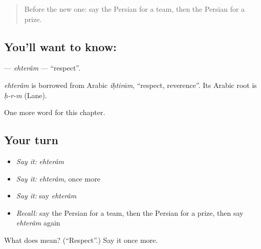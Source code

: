 \begin{quote}
Before the new one: say the Persian for a team, then the Persian for a prize.
\end{quote}

\subsection*{You'll want to know: }
\textbf{} — \emph{ehterâm} — \textquotedblleft{}respect\textquotedblright{}.

\begin{cousinweb}
\emph{ehterâm} is borrowed from Arabic \emph{iḥtirām}, \textquotedblleft{}respect, reverence\textquotedblright{}. Its Arabic root is \emph{ḥ-r-m} (Lane).
\end{cousinweb}

\begin{grammarlens}[title={What you've built}]
One more word for this chapter.
\end{grammarlens}

\subsection*{Your turn}
\begin{itemize}
\raggedright
  \item \emph{Say it:} \emph{ehterâm}
  \item \emph{Say it:} \emph{ehterâm}, once more
  \item \emph{Say it:} say \emph{ehterâm}
  \item \emph{Recall:} say the Persian for a team, then the Persian for a prize, then say \emph{ehterâm} again
\end{itemize}

\begin{tcolorbox}[breakable,colback=teal!4,colframe=teal!35!black,title={Before you move on}]
What does  mean? (\textquotedblleft{}Respect\textquotedblright{}.) Say it once more.
\end{tcolorbox}
